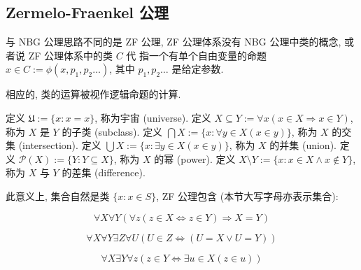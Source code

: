 \subsection{Zermelo-Fraenkel 公理}

与 NBG 公理思路不同的是 ZF 公理, ZF 公理体系没有 NBG 公理中类的概念, 或者说 ZF 公理体系中的类 \(C\) 代
指一个有单个自由变量的命题 \(x \in C := \phi(x, p_1, p_2 \dots)\), 其中 \(p_1, p_2 \dots\) 是给定参数.

相应的, 类的运算被视作逻辑命题的计算.

\begin{definition}
    \label {definition:ZF universe}
    定义 \(\mathfrak{U} := \{x : x = x\}\), 称为宇宙 (universe).
    \label {definition:ZF subclass}
    定义 \(X \subseteq Y := \forall x (x \in X \Rightarrow x \in Y)\), 称为 \(X\) 是 \(Y\) 的子类 (subclass).
    \label {definition:ZF class intersection}
    定义 \(\bigcap X := \{x : \forall y \in X (x \in y)\}\), 称为 \(X\) 的交集 (intersection).
    \label {definition:ZF class union}
    定义 \(\bigcup X := \{x : \exists y \in X (x \in y)\}\), 称为 \(X\) 的并集 (union).
    \label {definition:ZF power class}
    定义 \(\mathcal{P} (X) := \{Y : Y \subseteq X\}\), 称为 \(X\) 的幂 (power).
    \label {definition:ZF class difference}
    定义 \(X \setminus Y := \{x : x \in X \land x \notin Y\}\), 称为 \(X\) 与 \(Y\) 的差集 (difference).
\end{definition}

此意义上, 集合自然是类 \(\{x:x \in S\}\), ZF 公理包含 (本节大写字母亦表示集合):

\begin{axiom}
    \label {axiom:ZF Axiom of Extensionality}
    \[
        \forall X \forall Y (\forall z (z \in X \Leftrightarrow z \in Y) \Rightarrow X = Y)
    \]
\end{axiom}

\begin{axiom}
    \label {axiom:ZF Axiom of Pair}
    \[
        \forall X \forall Y \exists Z \forall U (U \in Z \Leftrightarrow (U = X \lor U = Y))
    \]
\end{axiom}

\begin{axiom}
    \label {axiom:ZF Axiom of Union}
    \[
        \forall X \exists Y \forall z (z \in Y \Leftrightarrow \exists u \in X (z \in u))
    \]
\end{axiom}

